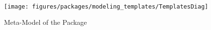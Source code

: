 %
%

\begin{figure}[htb]
  \centering
  \texttt{[image: figures/packages/modeling\_templates/TemplatesDiag]}
  \caption{Meta-Model of the  Package}
  \label{fig:MM:templates}
\end{figure}
